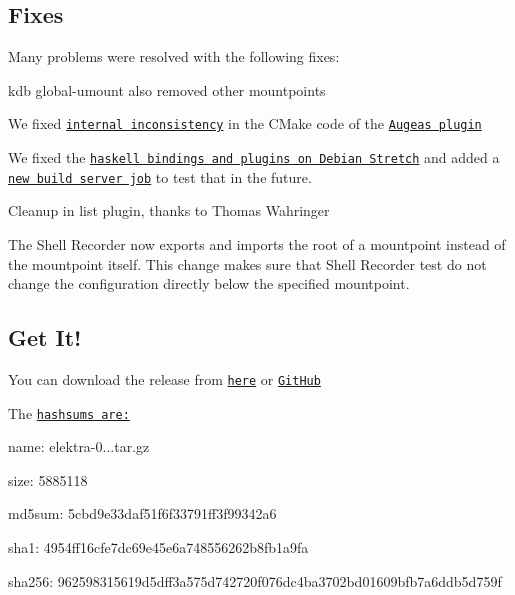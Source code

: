 \subsection*{Fixes}

Many problems were resolved with the following fixes\+:


\begin{DoxyItemize}
\item {\ttfamily kdb global-\/umount} also removed other mountpoints
\item We fixed \href{https://github.com/ElektraInitiative/libelektra/pull/1761}{\tt internal inconsistency} in the C\+Make code of the \href{https://www.libelektra.org/plugins/augeas}{\tt Augeas plugin}
\item We fixed the \href{https://github.com/ElektraInitiative/libelektra/pull/1787}{\tt haskell bindings and plugins on Debian Stretch} and added a \href{https://build.libelektra.org/job/elektra-haskell/}{\tt new build server job} to test that in the future.
\item Cleanup in list plugin, thanks to Thomas Wahringer
\item The Shell Recorder now exports and imports the root of a mountpoint instead of the mountpoint itself. This change makes sure that Shell Recorder test do not change the configuration directly below the specified mountpoint.
\end{DoxyItemize}

\subsection*{Get It!}

You can download the release from \href{https://www.libelektra.org/ftp/elektra/releases/elektra-0.8.22.tar.gz}{\tt here} or \href{https://github.com/ElektraInitiative/ftp/blob/master/releases/elektra-0.8.22.tar.gz?raw=true}{\tt Git\+Hub}

The \href{https://github.com/ElektraInitiative/ftp/blob/master/releases/elektra-0.8.22.tar.gz.hashsum?raw=true}{\tt hashsums are\+:}


\begin{DoxyItemize}
\item name\+: elektra-\/0...\+tar.\+gz
\item size\+: 5885118
\item md5sum\+: 5cbd9e33daf51f6f33791ff3f99342a6
\item sha1\+: 4954ff16cfe7dc69e45e6a748556262b8fb1a9fa
\item sha256\+: 962598315619d5dff3a575d742720f076dc4ba3702bd01609bfb7a6ddb5d759f
\end{DoxyItemize}

